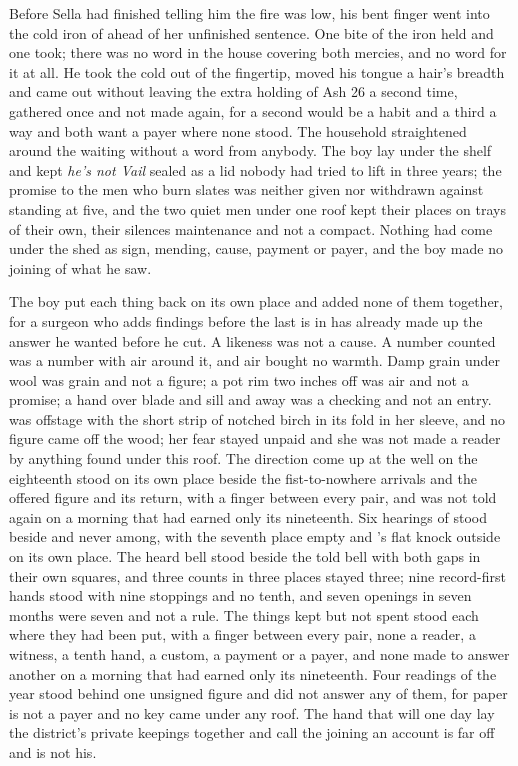 Before Sella had finished telling him the fire was low, his bent finger went into the cold iron of  ahead of her unfinished sentence. One bite of the iron held and one took; there was no word in the house covering both mercies, and no  word for it at all. He took the cold out of the fingertip, moved his tongue a hair's breadth and came out without leaving the extra holding of Ash 26 a second time, gathered once and not made again, for a second would be a habit and a third a way and both want a payer where none stood. The household straightened around the waiting without a word from anybody. The boy lay under the shelf and kept \emph{he's not Vail} sealed as a lid nobody had tried to lift in three years; the promise to the men who burn slates was neither given nor withdrawn against  standing at five, and the two quiet men under one roof kept their places on trays of their own, their silences maintenance and not a compact. Nothing had come under the shed as sign, mending, cause, payment or payer, and the boy made no joining of what he saw.

\scenebreak

The boy put each thing back on its own place and added none of them together, for a surgeon who adds findings before the last is in has already made up the answer he wanted before he cut. A likeness was not a cause. A number counted was a number with air around it, and air bought no warmth. Damp grain under wool was grain and not a figure; a pot rim two inches off was air and not a promise; a hand over blade and sill and away was a checking and not an entry.  was offstage with the short strip of notched birch in its fold in her sleeve, and no figure came off the wood; her fear stayed unpaid and she was not made a reader by anything found under this roof. The direction come up at the well on the eighteenth stood on its own place beside the fist-to-nowhere arrivals and the offered figure and its return, with a finger between every pair, and was not told again on a morning that had earned only its nineteenth. Six hearings of  stood beside and never among, with the seventh place empty and 's flat knock outside on its own place. The heard bell stood beside the told bell with both gaps in their own squares, and three counts in three places stayed three; nine record-first hands stood with nine stoppings and no tenth, and seven openings in seven months were seven and not a rule. The things kept but not spent stood each where they had been put, with a finger between every pair, none a reader, a witness, a tenth hand, a custom, a payment or a payer, and none made to answer another on a morning that had earned only its nineteenth. Four readings of the year stood behind one unsigned figure and did not answer any of them, for paper is not a payer and no key came under any roof. The hand that will one day lay the district's private keepings together and call the joining an account is far off and is not his.

